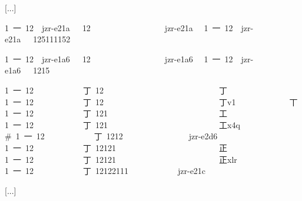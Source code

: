 [...] 
 
1 {\cjk{}一} 12  jzr-e21a  { }12                  jzr-e21a  {} 
1 {\cjk{}一} 12  jzr-e21a  { }125111152                     {} 
 
1 {\cjk{}一} 12  jzr-e1a6  { }12                  jzr-e1a6  {} 
1 {\cjk{}一} 12  jzr-e1a6  { }1215                          {} 
 
1 {\cjk{}一} 12            {\cjk{}丁} 12                            {\cjk{}丁} 
1 {\cjk{}一} 12            {\cjk{}丁} 12                            {\cjk{}丁}v1             {\cjk{}丅} 
1 {\cjk{}一} 12            {\cjk{}丁} 121                           {\cjk{}工} 
1 {\cjk{}一} 12            {\cjk{}丁} 121                           {\cjk{}工}x4q            {} 
\# 1 {\cjk{}一} 12            {\cjk{}丁} 1212                jzr-e2d6  {} 
1 {\cjk{}一} 12            {\cjk{}丁} 12121                         {\cjk{}正} 
1 {\cjk{}一} 12            {\cjk{}丁} 12121                         {\cjk{}正}xlr            {} 
1 {\cjk{}一} 12            {\cjk{}丁} 12122111            jzr-e21c  {} 
 
[...] 
 
